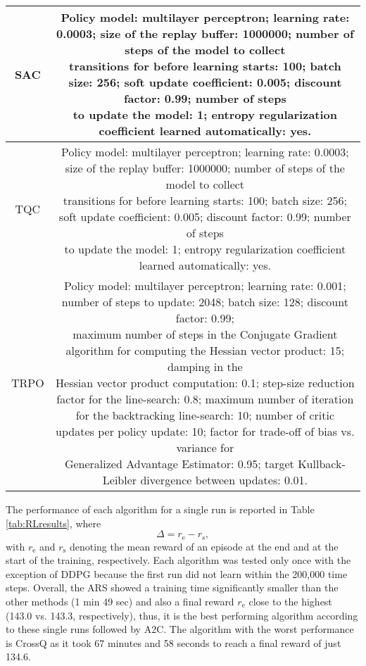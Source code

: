 \documentclass[lettersize,journal]{IEEEtran}
\begin{document}
\begin{table*}
\begin{tabular}{cc}
\hline
SAC & \makecell{Policy model: multilayer perceptron; learning rate: 0.0003; size of the replay buffer: 1000000;  number of steps of the model to collect \\ transitions for before learning starts: 100; batch size: 256; soft update coefficient: 0.005; discount factor: 0.99; number of steps \\ to update the model: 1; entropy regularization coefficient learned automatically: yes.}\\
\hline
TQC &  \makecell{Policy model: multilayer perceptron; learning rate: 0.0003; size of the replay buffer: 1000000; number of steps of the model to collect \\ transitions for before learning starts: 100; batch size: 256; soft update coefficient: 0.005; discount factor: 0.99; number of steps \\ to update the model: 1; entropy regularization coefficient learned automatically: yes.}\\
\hline
TRPO & \makecell{Policy model: multilayer perceptron; learning rate: 0.001; number of steps to update: 2048; batch size: 128; discount factor: 0.99; \\ maximum number of steps in the Conjugate Gradient algorithm for computing the Hessian vector product: 15; damping in the \\ Hessian vector product computation: 0.1; step-size reduction factor for the line-search: 0.8; maximum number of iteration \\ for the backtracking line-search: 10; number of critic updates per policy update: 10; factor for trade-off of bias vs. variance for \\ Generalized Advantage Estimator: 0.95; target Kullback-Leibler divergence between updates: 0.01.}\\
\hline
\end{tabular}
\end{table*}

The performance of each algorithm for a single run is reported in Table \ref{tab:RLresults}, where
\begin{equation}
\Delta = r_\text{e} - r_\text{s},
\end{equation}
with $r_\text{e}$ and $r_\text{s}$ denoting the mean reward of an episode at the end and at the start of the training, respectively. Each algorithm was tested only once with the exception of DDPG because the first run did not learn within the 200,000 time steps. Overall, the ARS showed a training time significantly smaller than the other methods (1 min 49 sec) and also a final reward $r_\text{e}$ close to the highest (143.0 vs. 143.3, respectively), thus, it is the best performing algorithm according to these single runs followed by A2C. The algorithm with the worst performance is CrossQ as it took 67 minutes and 58 seconds to reach a final reward of just 134.6. 
\end{document}
